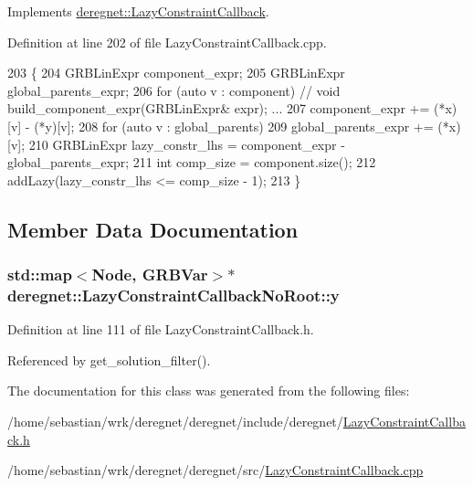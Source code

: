 Implements \hyperlink{classderegnet_1_1LazyConstraintCallback_a8f6db7da84271afcd2e2169318569558}{deregnet\+::\+Lazy\+Constraint\+Callback}.



Definition at line 202 of file Lazy\+Constraint\+Callback.\+cpp.


\begin{DoxyCode}
203                                                                                            \{
204     GRBLinExpr component\_expr;
205     GRBLinExpr global\_parents\_expr;
206     \textcolor{keywordflow}{for} (\textcolor{keyword}{auto} v : component)                      \textcolor{comment}{// void build\_component\_expr(GRBLinExpr& expr); ...}
207         component\_expr += (*x)[v] - (*y)[v];
208     \textcolor{keywordflow}{for} (\textcolor{keyword}{auto} v : global\_parents)
209         global\_parents\_expr += (*x)[v];
210     GRBLinExpr lazy\_constr\_lhs = component\_expr - global\_parents\_expr;
211     \textcolor{keywordtype}{int} comp\_size = component.size();
212     addLazy(lazy\_constr\_lhs <= comp\_size - 1);
213 \}
\end{DoxyCode}


\subsection{Member Data Documentation}
\subsubsection[{\texorpdfstring{y}{y}}]{\setlength{\rightskip}{0pt plus 5cm}std\+::map$<${\bf Node}, G\+R\+B\+Var$>$$\ast$ deregnet\+::\+Lazy\+Constraint\+Callback\+No\+Root\+::y\hspace{0.3cm}{\ttfamily [private]}}\hypertarget{classderegnet_1_1LazyConstraintCallbackNoRoot_aaa32cd3d5b65d1c41174cbc9a120ab64}{}\label{classderegnet_1_1LazyConstraintCallbackNoRoot_aaa32cd3d5b65d1c41174cbc9a120ab64}


Definition at line 111 of file Lazy\+Constraint\+Callback.\+h.



Referenced by get\+\_\+solution\+\_\+filter().



The documentation for this class was generated from the following files\+:\begin{DoxyCompactItemize}
\item 
/home/sebastian/wrk/deregnet/deregnet/include/deregnet/\hyperlink{LazyConstraintCallback_8h}{Lazy\+Constraint\+Callback.\+h}\item 
/home/sebastian/wrk/deregnet/deregnet/src/\hyperlink{LazyConstraintCallback_8cpp}{Lazy\+Constraint\+Callback.\+cpp}\end{DoxyCompactItemize}
